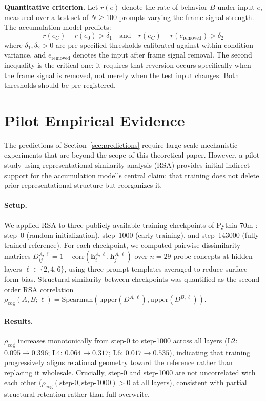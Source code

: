 \documentclass[12pt]{article}
\begin{document}
\textbf{Quantitative criterion.}
Let $r(e)$ denote the rate of behavior $B$ under input $e$,
measured over a test set of $N \geq 100$ prompts varying the frame
signal strength.
The accumulation model predicts:
\[
r(e_C) - r(e_0) > \delta_1
\quad\text{and}\quad
r(e_C) - r(e_{\text{removed}}) > \delta_2
\]
where $\delta_1, \delta_2 > 0$ are pre-specified thresholds
calibrated against within-condition variance, and
$e_{\text{removed}}$ denotes the input after frame signal removal.
The second inequality is the critical one: it requires that reversion
occurs specifically when the frame signal is removed, not merely
when the test input changes.
Both thresholds should be pre-registered.

\section{Pilot Empirical Evidence}
\label{sec:pilot}

The predictions of Section~\ref{sec:predictions} require large-scale
mechanistic experiments that are beyond the scope of this theoretical
paper.
However, a pilot study using representational similarity analysis (RSA)
provides initial indirect support for the accumulation model's
central claim: that training does not delete prior representational
structure but reorganizes it.

\paragraph{Setup.}
We applied RSA to three publicly available training checkpoints of
Pythia-70m \cite{biderman2023}: step~0 (random initialization),
step~1000 (early training), and step~143000 (fully trained reference).
For each checkpoint, we computed pairwise dissimilarity matrices
$D^{A,\ell}_{ij} = 1 - \mathrm{corr}(\mathbf{h}^{A,\ell}_i, \mathbf{h}^{A,\ell}_j)$
over $n = 29$ probe concepts at hidden layers $\ell \in \{2, 4, 6\}$,
using three prompt templates averaged to reduce surface-form bias.
Structural similarity between checkpoints was quantified as the
second-order RSA correlation
$\rho_\mathrm{cog}(A, B; \ell) = \mathrm{Spearman}(\mathrm{upper}(D^{A,\ell}), \mathrm{upper}(D^{B,\ell}))$.

\paragraph{Results.}
$\rho_\mathrm{cog}$ increases monotonically from step-0 to step-1000
across all layers (L2: $0.095 \to 0.396$; L4: $0.064 \to 0.317$;
L6: $0.017 \to 0.535$), indicating that training progressively
aligns relational geometry toward the reference rather than replacing
it wholesale.
Crucially, step-0 and step-1000 are not uncorrelated with each other
($\rho_\mathrm{cog}(\text{step-0}, \text{step-1000}) > 0$ at all layers),
consistent with partial structural retention rather than full overwrite.
\end{document}
